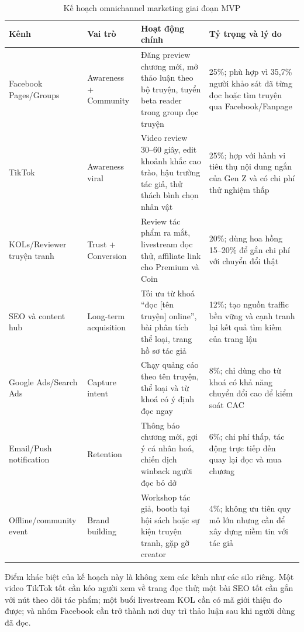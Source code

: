 \begin{table}[htbp]
\centering
\caption{Kế hoạch omnichannel marketing giai đoạn MVP}
\label{tab:omnichannel-plan}
\renewcommand{\arraystretch}{1.25}
\small
\begin{tabular}{|L{2.4cm}|L{2.8cm}|L{4.0cm}|L{4.2cm}|}
\hline
\textbf{Kênh} & \textbf{Vai trò} & \textbf{Hoạt động chính} & \textbf{Tỷ trọng và lý do} \\
\hline
Facebook Pages/Groups
& Awareness + Community
& Đăng preview chương mới, mở thảo luận theo bộ truyện, tuyển beta reader trong group đọc truyện
& 25\%; phù hợp vì 35{,}7\% người khảo sát đã từng đọc hoặc tìm truyện qua Facebook/Fanpage \\
\hline
TikTok
& Awareness viral
& Video review 30--60 giây, edit khoảnh khắc cao trào, hậu trường tác giả, thử thách bình chọn nhân vật
& 25\%; hợp với hành vi tiêu thụ nội dung ngắn của Gen Z và có chi phí thử nghiệm thấp \\
\hline
KOLs/\allowbreak Reviewer truyện tranh
& Trust + Conversion
& Review tác phẩm ra mắt, livestream đọc thử, affiliate link cho Premium và Coin
& 20\%; dùng hoa hồng 15--20\% để gắn chi phí với chuyển đổi thật \\
\hline
SEO và content hub
& Long-term acquisition
& Tối ưu từ khoá ``đọc [tên truyện] online'', bài phân tích thể loại, trang hồ sơ tác giả
& 12\%; tạo nguồn traffic bền vững và cạnh tranh lại kết quả tìm kiếm của trang lậu \\
\hline
Google Ads/Search Ads
& Capture intent
& Chạy quảng cáo theo tên truyện, thể loại và từ khoá có ý định đọc ngay
& 8\%; chỉ dùng cho từ khoá có khả năng chuyển đổi cao để kiểm soát CAC \\
\hline
Email/Push notification
& Retention
& Thông báo chương mới, gợi ý cá nhân hoá, chiến dịch winback người đọc bỏ dở
& 6\%; chi phí thấp, tác động trực tiếp đến quay lại đọc và mua chương \\
\hline
Offline/\allowbreak community event
& Brand building
& Workshop tác giả, booth tại hội sách hoặc sự kiện truyện tranh, gặp gỡ creator
& 4\%; không ưu tiên quy mô lớn nhưng cần để xây dựng niềm tin với tác giả \\
\hline
\end{tabular}
\end{table}

Điểm khác biệt của kế hoạch này là không xem các kênh như các silo riêng. Một video TikTok tốt cần kéo người xem về trang đọc thử; một bài SEO tốt cần gắn với nút theo dõi tác phẩm; một buổi livestream KOL cần có mã giới thiệu đo được; và nhóm Facebook cần trở thành nơi duy trì thảo luận sau khi người dùng đã đọc.

